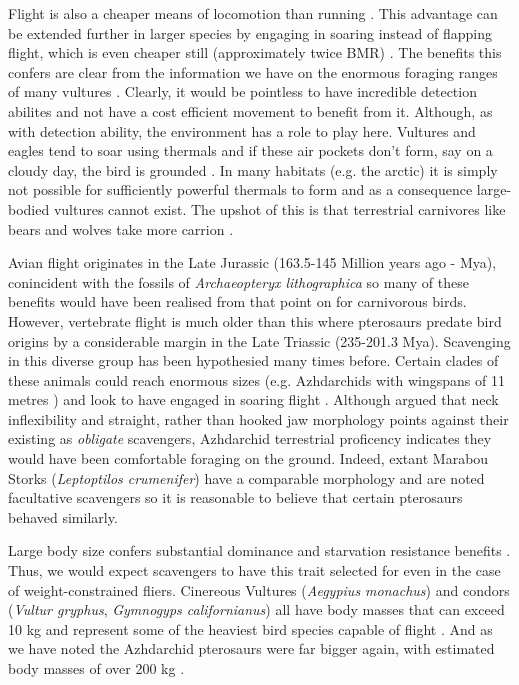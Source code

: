 \documentclass[a4paper,12pt]{article}
\begin{document}
Flight is also a cheaper means of locomotion than running \citep{tucker1975energetic}.
This advantage can be extended further in larger species by engaging in soaring instead of flapping flight, which is even cheaper still (approximately twice BMR) \citep{hedenstrom1993migration}.
The benefits this confers are clear from the information we have on the enormous foraging ranges of many vultures \citep{spiegel2013factors}.
Clearly, it would be pointless to have incredible detection abilites and not have a cost efficient movement to benefit from it.
Although, as with detection ability, the environment has a role to play here.
Vultures and eagles tend to soar using thermals and if these air pockets don't form, say on a cloudy day, the bird is grounded \citep{mundy1992vultures}.
In many habitats (e.g. the arctic) it is simply not possible for sufficiently powerful thermals to form and as a consequence large-bodied vultures cannot exist.
The upshot of this is that terrestrial carnivores like bears and wolves take more carrion \citep{devault2003scavenging}.


Avian flight originates in the Late Jurassic (163.5-145 Million years ago - Mya), conincident with the fossils of \textit{Archaeopteryx lithographica} so many of these benefits would have been realised from that point on for carnivorous birds.
However, vertebrate flight is much older than this where pterosaurs predate bird origins by a considerable margin in the Late Triassic (235-201.3 Mya).
Scavenging in this diverse group has been hypothesied many times before.
Certain clades of these animals could reach enormous sizes (e.g. Azhdarchids with wingspans of 11 metres \citep{witton2010size}) and look to have engaged in soaring flight \citep{witton2010size}.
Although \cite{witton2008reappraisal} argued that neck inflexibility and straight, rather than hooked jaw morphology points against their existing as \textit{obligate} scavengers, Azhdarchid terrestrial proficency indicates they would have been comfortable foraging on the ground.
Indeed, extant Marabou Storks (\textit{Leptoptilos crumenifer}) %
have a comparable morphology and are noted facultative scavengers so it is reasonable to believe that certain pterosaurs behaved similarly.
 

Large body size confers substantial dominance and starvation resistance benefits \citep{ruxton2004obligate}.
Thus, we would expect scavengers to have this trait selected for even in the case of weight-constrained fliers.
Cinereous Vultures (\textit{Aegypius monachus}) and condors (\textit{Vultur gryphus}, \textit{Gymnogyps californianus}) all have body masses that can exceed 10 kg and represent some of the heaviest bird species capable of flight \citep{ferguson2001raptors,donazar2002effects}.
And as we have noted the Azhdarchid pterosaurs were far bigger again, with estimated body masses of over 200 kg \citep{witton2010size}.
 
\end{document}
